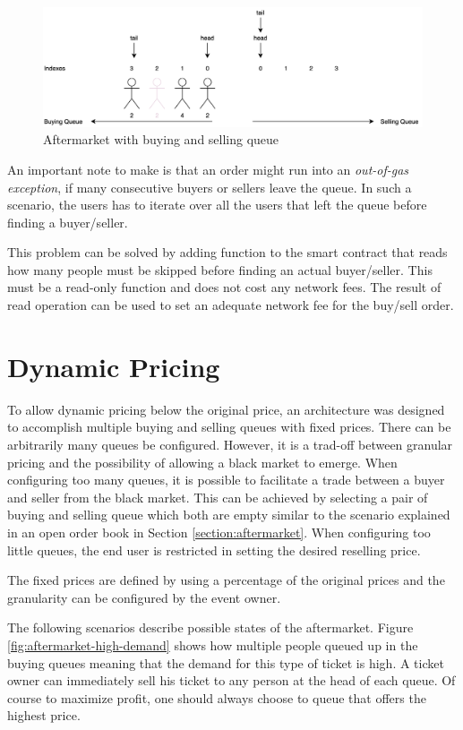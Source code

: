\begin{figure}[H]
    \centering
    \includegraphics[width=16cm]{figures/aftermarket-queue.png}
    \caption{Aftermarket with buying and selling queue}
    \label{fig:aftermarket-queue}
\end{figure}

An important note to make is that an order might run into an \textit{out-of-gas exception}, if many consecutive buyers or sellers leave the queue. In such a scenario, the users has to iterate over all the users that left the queue before finding a buyer/seller. 

This problem can be solved by adding function to the smart contract that reads how many people must be skipped before finding an actual buyer/seller. This must be a read-only function and does not cost any network fees. The result of read operation can be used to set an adequate network fee for the buy/sell order. 

\section{Dynamic Pricing}
To allow dynamic pricing below the original price, an architecture was designed to accomplish multiple buying and selling queues with fixed prices. There can be arbitrarily many queues be configured. However, it is a trad-off between granular pricing and the possibility of allowing a black market to emerge. When configuring too many queues, it is possible to facilitate a trade between a buyer and seller from the black market. This can be achieved by selecting a pair of buying and selling queue which both are empty similar to the scenario explained in an open order book in Section \ref{section:aftermarket}. When configuring too little queues, the end user is restricted in setting the desired reselling price. 

The fixed prices are defined by using a percentage of the original prices and the granularity can be configured by the event owner. 

The following scenarios describe possible states of the aftermarket. Figure \ref{fig:aftermarket-high-demand} shows how multiple people queued up in the buying queues meaning that the demand for this type of ticket is high. A ticket owner can immediately sell his ticket to any person at the head of each queue. Of course to maximize profit, one should always choose to queue that offers the highest price.

